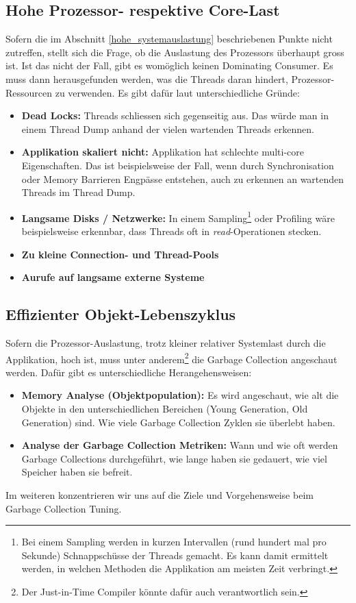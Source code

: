 \subsection{Hohe Prozessor- respektive Core-Last}
Sofern die im Abschnitt \ref{hohe_systemauslastung} beschriebenen Punkte nicht zutreffen, stellt sich die Frage, ob die Auslastung des Prozessors überhaupt gross ist. Ist das nicht der Fall, gibt es womöglich keinen Dominating Consumer. Es muss dann herausgefunden werden, was die Threads daran hindert, Prozessor-Ressourcen zu verwenden. Es gibt dafür laut \cite{pepperdine201102} unterschiedliche Gründe:
\begin{itemize}
\item \textbf{Dead Locks: } Threads schliessen sich gegenseitig aus. Das würde man in einem Thread Dump anhand der vielen wartenden Threads erkennen. 
\item \textbf{Applikation skaliert nicht: } Applikation hat schlechte multi-core Eigenschaften. Das ist beispielsweise der Fall, wenn durch Synchronisation oder Memory Barrieren Engpässe entstehen, auch zu erkennen an wartenden Threads im Thread Dump.
\item \textbf{Langsame Disks / Netzwerke: }In einem Sampling\footnote{Bei einem Sampling werden in kurzen Intervallen (rund hundert mal pro Sekunde) Schnappschüsse der Threads gemacht. Es kann damit ermittelt werden, in welchen Methoden die Applikation am meisten Zeit verbringt.} oder Profiling wäre beispielsweise erkennbar, dass Threads oft in \textit{read}-Operationen stecken.
\item \textbf{Zu kleine Connection- und Thread-Pools}
\item \textbf{Aurufe auf langsame externe Systeme}
\end{itemize}


\subsection{Effizienter Objekt-Lebenszyklus}
Sofern die Prozessor-Auslastung, trotz kleiner relativer Systemlast durch die Applikation, hoch ist, muss unter anderem\footnote{Der Just-in-Time Compiler könnte dafür auch verantwortlich sein.} die Garbage Collection angeschaut werden. Dafür gibt es unterschiedliche Herangehensweisen:
\begin{itemize}
\item \textbf{Memory Analyse (Objektpopulation): }Es wird angeschaut, wie alt die Objekte in den unterschiedlichen Bereichen (Young Generation, Old Generation) sind. Wie viele Garbage Collection Zyklen sie überlebt haben.
\item \textbf{Analyse der Garbage Collection Metriken: }Wann und wie oft werden Garbage Collections durchgeführt, wie lange haben sie gedauert, wie viel Speicher haben sie befreit.
\end{itemize}
Im weiteren konzentrieren wir uns auf die Ziele und Vorgehensweise beim Garbage Collection Tuning.

